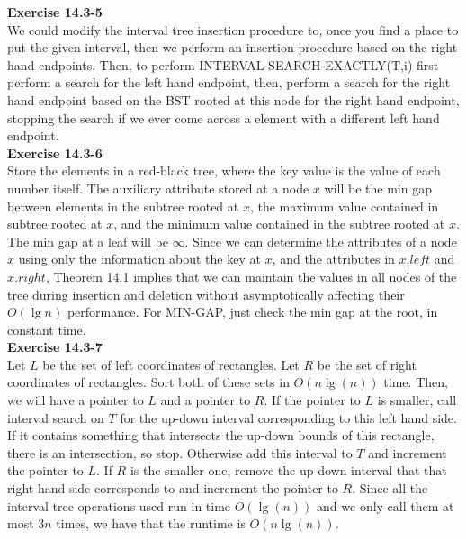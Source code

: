 \documentclass{article}
\begin{document}
\noindent\textbf{ Exercise 14.3-5} \\

We could modify the interval tree insertion procedure to, once you find a place to put the given interval, then we perform an insertion procedure based on the right hand endpoints. Then, to perform INTERVAL-SEARCH-EXACTLY(T,i) first perform a search for the left hand endpoint, then, perform a search for the right hand endpoint based on the BST rooted at this node for the right hand endpoint, stopping the search if we ever come across a element with a different left hand endpoint.\\

\noindent\textbf{Exercise 14.3-6}\\

Store the elements in a red-black tree, where the key value is the value of each number itself.  The auxiliary attribute stored at a node $x$ will be the min gap between elements in the subtree rooted at $x$, the maximum value contained in subtree rooted at $x$, and the minimum value contained in the subtree rooted at $x$.  The min gap at a leaf will be $\infty$.  Since we can determine the attributes of a node $x$ using only the information about the key at $x$, and the attributes in $x.left$ and $x.right$, Theorem 14.1 implies that we can maintain the values in all nodes of the tree during insertion and deletion without asymptotically affecting their $O(\lg n)$ performance.  For MIN-GAP, just check the min gap at the root, in constant time.\\


\noindent\textbf{ Exercise 14.3-7} \\

Let $L$ be the set of left coordinates of rectangles. Let $R$ be the set of right coordinates of rectangles. Sort both of these sets in $O(n\lg(n))$ time. Then, we will have a pointer to $L$ and a pointer to $R$. If the pointer to $L$ is smaller, call interval search on $T$ for the up-down interval corresponding to this left hand side. If it contains something that intersects the up-down bounds of this rectangle, there is an intersection, so stop. Otherwise add this interval to $T$ and increment the pointer to $L$. If $R$ is the smaller one, remove the up-down interval that that right hand side corresponds to and increment the pointer to $R$. Since all the interval tree operations used run in time $O(\lg(n))$ and we only call them at most $3n$ times, we have that the runtime is $O(n\lg(n))$.\\
\end{document}
